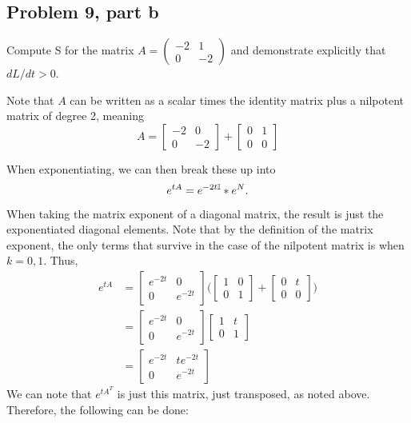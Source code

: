 \subsection{Problem 9, part b}
Compute S for the matrix $A = \begin{pmatrix}-2 &1\\ 0 &-2\end{pmatrix}$ and demonstrate explicitly that $dL/dt > 0$.
\partbreak
\begin{solution}

    Note that $A$ can be written as a scalar times the identity matrix plus a nilpotent matrix of degree 2, meaning
    \[
    A = \begin{bmatrix}-2 &0\\ 0 &-2\end{bmatrix} + \begin{bmatrix}0 &1\\ 0 &0\end{bmatrix}
    \]

    When exponentiating, we can then break these up into
    \[
    e^{tA} = e^{-2t\mathbb{I}} * e^N.
    \]

    When taking the matrix exponent of a diagonal matrix, the result is just the exponentiated diagonal elements. Note that by the definition of the matrix exponent, the only terms that survive in the case of the nilpotent matrix is when $k = 0, 1$. Thus,
    \begin{align}
            e^{tA} &= \begin{bmatrix}e^{-2t} &0\\0 &e^{-2t}\end{bmatrix}\Bigg( \begin{bmatrix}1 &0 \\0 &1\end{bmatrix} + \begin{bmatrix}0 &t\\ 0 &0\end{bmatrix}\Bigg)\nonumber\\
            &= \begin{bmatrix}e^{-2t} &0\\0 &e^{-2t}\end{bmatrix}\begin{bmatrix}1 &t \\0 &1\end{bmatrix}\nonumber\\
            &= \begin{bmatrix}e^{-2t} &te^{-2t}\\ 0 &e^{-2t}\end{bmatrix}\nonumber
    \end{align}
    We can note that $e^{tA^T}$ is just this matrix, just transposed, as noted above. Therefore, the following can be done:


\end{solution}

